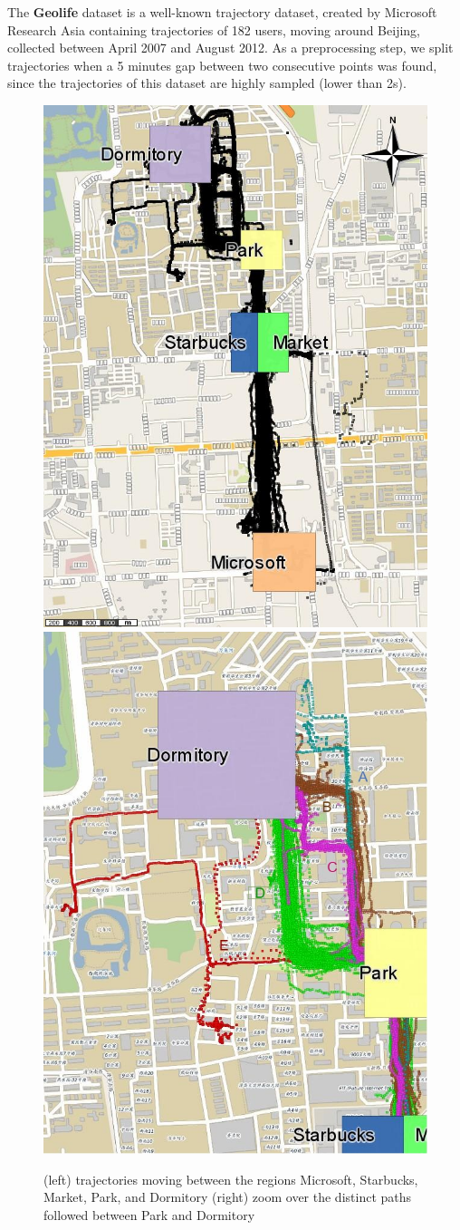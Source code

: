 \documentclass[12pt]{article}
\begin{document}
The \textbf{Geolife} dataset is a well-known trajectory dataset, created by Microsoft Research Asia \cite{zheng2009mining} containing trajectories of 182 users, moving around Beijing, collected between April 2007 and August 2012. As a preprocessing step, we split trajectories when a 5 minutes gap between two consecutive points was found, since the trajectories of this dataset are highly sampled (lower than 2s).

\begin{figure}[ht!]
\centering
\centerline{
\includegraphics[width=.5\textwidth]{Images/Geolife-Trajectories-painted}
\includegraphics[width=.5\textwidth]{Images/Geolife-Paths-painted}
}
\caption{(left) trajectories moving between the regions Microsoft, Starbucks, Market, Park, and Dormitory (right) zoom over the distinct paths followed between Park and Dormitory}
\label{fig:geolife_map_rois}
\end{figure}
\end{document}
